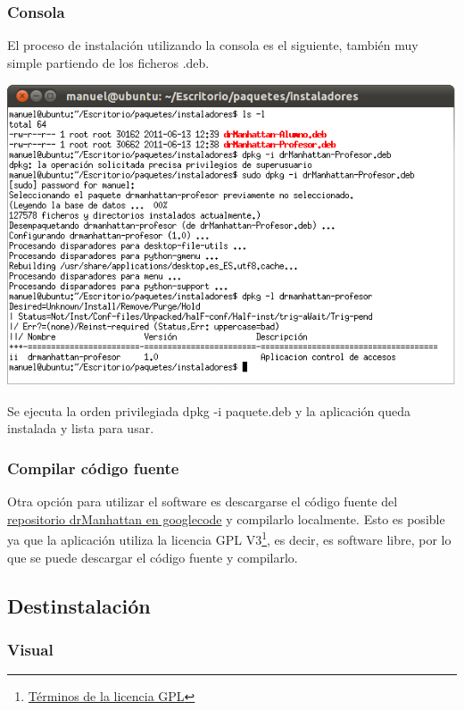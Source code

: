 \documentclass[11pt]{article}
\begin{document}
\subsubsection{Consola}

El proceso de instalación utilizando la consola es el siguiente, también muy simple partiendo de los ficheros .deb.


\begin{center}

    \includegraphics[width=.90\linewidth]{imagenes/instalacionConsola}

\end{center}

Se ejecuta la orden privilegiada dpkg -i paquete.deb y la aplicación queda instalada y lista para usar.

\subsubsection{Compilar código fuente}

Otra opción para utilizar el software es descargarse el código fuente del \href{http://code.google.com/p/drmanhattan/}{repositorio drManhattan en googlecode} y compilarlo localmente. Esto es posible ya que la aplicación utiliza la licencia GPL V3\footnote{\href{http://www.gnu.org/licenses/gpl.html}{Términos de la licencia GPL}}, es decir, es software libre, por lo que se puede descargar el código fuente y compilarlo.



\subsection{Destinstalación}

\subsubsection{Visual}
\end{document}
